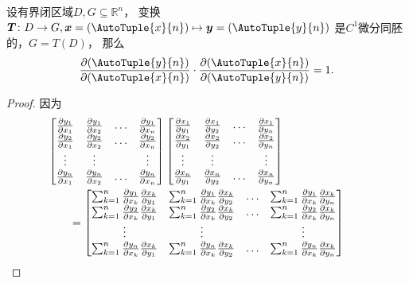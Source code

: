 \begin{proposition}
设有界闭区域\(D,G\subseteq\mathbb{R}^n\)，
变换\(\vb{T}\colon D \to G,\vb{x}=(\AutoTuple{x}{n})\mapsto\vb{y}=(\AutoTuple{y}{n})\)
是\(C^1\)微分同胚的，\(G = T(D)\)，
那么\[
	\jacobi{\AutoTuple{y}{n}}{\AutoTuple{x}{n}}
	\cdot
	\jacobi{\AutoTuple{x}{n}}{\AutoTuple{y}{n}}
	= 1.
\]
\begin{proof}
因为\begin{align*}
	&\hspace{-20pt}
	\begin{bmatrix}
		\pdv{y_1}{x_1} & \pdv{y_1}{x_2} & \dots & \pdv{y_1}{x_n} \\
		\pdv{y_2}{x_1} & \pdv{y_2}{x_2} & \dots & \pdv{y_2}{x_n} \\
		\vdots & \vdots & & \vdots \\
		\pdv{y_n}{x_1} & \pdv{y_n}{x_2} & \dots & \pdv{y_n}{x_n} \\
	\end{bmatrix}
	\begin{bmatrix}
		\pdv{x_1}{y_1} & \pdv{x_1}{y_2} & \dots & \pdv{x_1}{y_n} \\
		\pdv{x_2}{y_1} & \pdv{x_2}{y_2} & \dots & \pdv{x_2}{y_n} \\
		\vdots & \vdots & & \vdots \\
		\pdv{x_n}{y_1} & \pdv{x_n}{y_2} & \dots & \pdv{x_n}{y_n} \\
	\end{bmatrix} \\
	&= \begin{bmatrix}
		\sum_{k=1}^n \pdv{y_1}{x_k} \pdv{x_k}{y_1}
		& \sum_{k=1}^n \pdv{y_1}{x_k} \pdv{x_k}{y_2}
		& \dots
		& \sum_{k=1}^n \pdv{y_1}{x_k} \pdv{x_k}{y_n} \\
		\sum_{k=1}^n \pdv{y_2}{x_k} \pdv{x_k}{y_1}
		& \sum_{k=1}^n \pdv{y_2}{x_k} \pdv{x_k}{y_2}
		& \dots
		& \sum_{k=1}^n \pdv{y_2}{x_k} \pdv{x_k}{y_n} \\
		\vdots & \vdots & & \vdots \\
		\sum_{k=1}^n \pdv{y_n}{x_k} \pdv{x_k}{y_1}
		& \sum_{k=1}^n \pdv{y_n}{x_k} \pdv{x_k}{y_2}
		& \dots
		& \sum_{k=1}^n \pdv{y_n}{x_k} \pdv{x_k}{y_n} \\
	\end{bmatrix} \\

\end{align*}
\end{proof}
\end{proposition}
